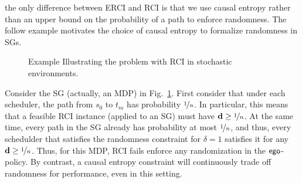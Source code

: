 the only difference between ERCI and RCI is that we use causal entropy
rather than an upper bound on the probability of a path to enforce
randomness.  The follow example motivates the choice of causal entropy
to formalize randomness in SGs.
\begin{figure}
\caption{Example Illustrating the problem with RCI in stochastic environments.\label{fig:drciOnSgs}}
\end{figure}

\begin{example}
  Consider the SG (actually, an MDP) in Fig.~\ref{fig:drciOnSgs}.
  First consider that under each scheduler, the path from $s_0$ to
  $t_m$ has probability $\nicefrac{1}{n}$. In particular, this means
  that a feasible RCI instance (applied to an SG) must have
  $\mathbf{d} \geq \nicefrac{1}{n}$. At the same time, every path in
  the SG already has probability at most $\nicefrac{1}{n}$, and thus,
  every schedulder that satisfies the randomness constraint for
  $\delta = 1$ satisfies it for any
  $\mathbf{d} \geq \nicefrac{1}{n}$. Thus, for this MDP, RCI fails
  enforce any randomization in the $\mathsf{ego}$-policy. By contrast, a
  causal entropy constraint will continuously trade off randomness
  for performance, even in this setting.
\end{example}

